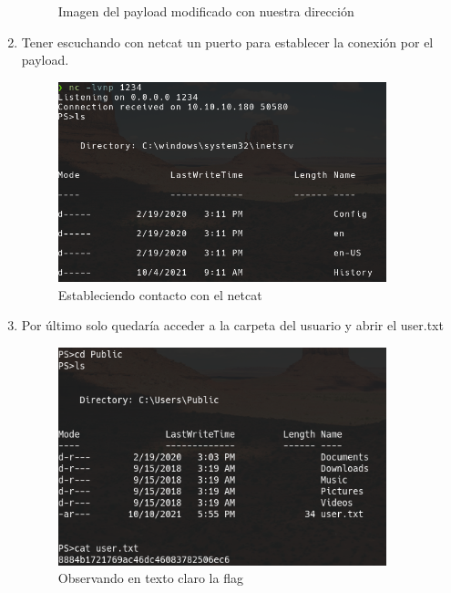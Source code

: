 \documentclass{article}
\begin{document}
\begin{enumerate}
\begin{figure}[h]
		\caption{Imagen del payload modificado con nuestra dirección}
	\end{figure}
\clearpage
	\item Tener escuchando con netcat un puerto para establecer la conexión por el payload.
	\begin{figure}[h!]
		\center
		\includegraphics[width=0.9\textwidth]{images/remote/netcat.png}
		\caption{Estableciendo contacto con el netcat}
	\end{figure}
	\item Por último solo quedaría acceder a la carpeta del usuario y abrir el user.txt 
	\begin{figure}[h!]
		\center
		\includegraphics[width=0.9\textwidth]{images/remote/flag-usuario.png}
		\caption{Observando en texto claro la flag}
	\end{figure}

\end{enumerate}

\clearpage
\end{document}
